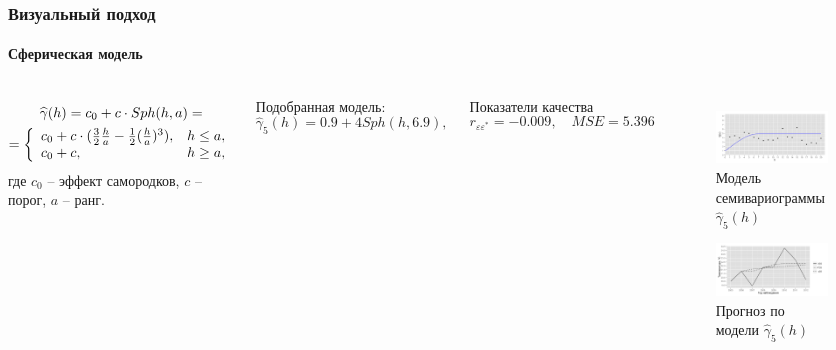 \documentclass[10pt,pdf,aspectratio=169,hyperref={unicode}]{beamer}
\begin{document}
\begin{frame}
  \frametitle{Визуальный подход}
  \framesubtitle{Сферическая модель}
  \begin{columns}[c]
  \column{3in}
  \begin{equation}\begin{gathered}
  \label{eq:sph}
    \widehat{\gamma}(h) = c_0 + c \cdot Sph(h, a) = \\
    = \left\{
    \begin{array}{l l}
      c_0 + c \cdot (\frac{3}{2} \frac{h}{a} - \frac{1}{2}(\frac{h}{a})^3), & h \le a, \\
      c_0 + c, & h \geq a,
    \end{array} \right.
  \end{gathered}\end{equation}
  где $ c_0 $ -- эффект самородков, $ c $ -- порог, $ a $ -- ранг.

  \vspace{0.5em}

  Подобранная модель:
  \begin{equation}
  \label{eq:gamma5}
    \widehat{\gamma}_5(h) = 0.9 + 4 Sph(h, 6.9),
  \end{equation}

  Показатели качества
  \begin{equation*}
    r_{\varepsilon\varepsilon^{*}} = -0.009, \quad MSE = 5.396
  \end{equation*}

  \column{3in}
  \vspace{-14.5pt}
  \begin{figure}[H]
    \includegraphics[width=0.9\linewidth]{../../figures/variogram/sph-fit-adapt-modeled.png} \\
    \caption{Модель семивариограммы $\widehat{\gamma}_5(h)$}
    \includegraphics[width=0.9\linewidth]{../../figures/variogram/sph-fit-adapt-cross-prediction.png}
    \caption{Прогноз по модели $\widehat{\gamma}_5(h)$}
  \end{figure}
  \end{columns}
\end{frame}
\end{document}

